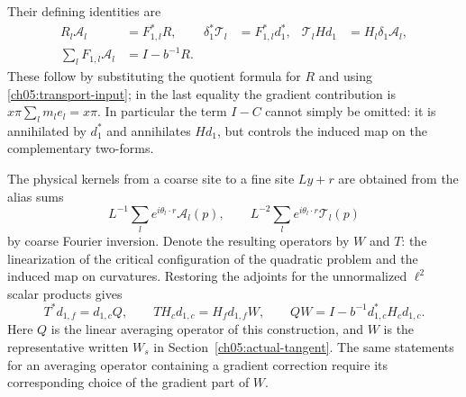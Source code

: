 Their defining identities are
\begin{align}
 R_l\mathcal A_l&=F_{1,l}^*R,&
 \delta_1^*\mathcal T_l&=F_{1,l}^*d_1^*,&
 \mathcal T_lHd_1&=H_l\delta_1\mathcal A_l,\\
 \sum_lF_{1,l}\mathcal A_l&=I-b^{-1}R.
 \label{ch05:transport-identities}
\end{align}
These follow by substituting the quotient formula for $R$ and
using \eqref{ch05:transport-input}; in the last equality the
gradient contribution is $x\pi\sum_lm_le_l=x\pi$.
In particular the term $I-C$ cannot simply be omitted: it is
annihilated by $d_1^*$ and annihilates $Hd_1$, but controls the
induced map on the complementary two-forms.

The physical kernels from a coarse site to a fine site $Ly+r$
are obtained from the alias sums
\[
 L^{-1}\sum_l e^{i\theta_l\cdot r}\mathcal A_l(p),
 \qquad
 L^{-2}\sum_l e^{i\theta_l\cdot r}\mathcal T_l(p)
\]
by coarse Fourier inversion. Denote the resulting operators by
$W$ and $T$: the linearization of the critical configuration of the quadratic problem and the induced map on curvatures. Restoring the adjoints for the unnormalized $\ell^2$ scalar products gives
\begin{equation}
 T^*d_{1,f}=d_{1,c}Q,\qquad
 TH_cd_{1,c}=H_fd_{1,f}W,\qquad
 QW=I-b^{-1}d_{1,c}^*H_cd_{1,c}.
 \label{ch05:physical-transports}
\end{equation}
Here $Q$ is the linear averaging operator of this construction, and $W$ is the representative written $W_s$ in Section~\ref{ch05:actual-tangent}.
The same statements for an averaging operator containing a gradient
correction require its corresponding choice of the gradient
part of $W$.

